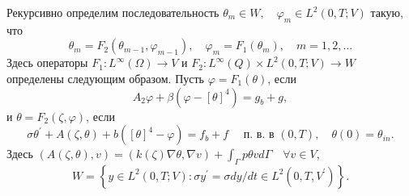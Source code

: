 \begin{frame}
    Рекурсивно определим последовательность
    $\theta_{m} \in W, \quad \varphi_{m} \in L^{2}(0, T ; V)$ такую, что
    \begin{equation}
        \label{eq:1_6:10}
        \theta_{m}=F_{2}\left(\theta_{m-1}, \varphi_{m-1}\right),
        \quad \varphi_{m}=F_{1}\left(\theta_{m}\right), \quad m=1,2, \ldots
    \end{equation}
    Здесь операторы $F_{1}: L^{\infty}(\Omega) \rightarrow V$ и
    $F_{2}: L^{\infty}(Q) \times L^{2}(0, T ; V) \rightarrow W$ определены следующим образом.
    Пусть $\varphi=F_{1}(\theta)$, если
    \begin{equation}
        \label{eq:1_6:6}
        A_{2} \varphi+\beta\left(\varphi-[\theta]^{4}\right)=g_{b}+g,
    \end{equation}
    и $\theta=F_{2}(\zeta, \varphi)$, если
    \begin{equation}
        \label{eq:1_6:7}
        \sigma \theta^{\prime}+A(\zeta, \theta)
        +b\left([\theta]^{4}-\varphi\right)=f_{b}+f
        \quad \text { п. в. в }(0, T), \quad \theta(0)=\theta_{i n}.
    \end{equation}
    Здесь
    $ (A(\zeta, \theta), v)=(k(\zeta) \nabla \theta, \nabla v) +\int_{\Gamma} p \theta v d \Gamma \quad \forall v \in V$,
    \[
        W=\left\{y \in L^{2}(0, T ; V): \sigma y^{\prime}=\sigma d y / d t \in L^{2}
        \left(0, T, V^{\prime}\right)\right\}.
    \]

\end{frame}

